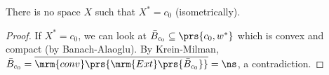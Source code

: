 \documentclass[10pt, twoside]{book}
\begin{document}
\begin{corollary}
There is no space $X$ such that $X^* = c_0$ (isometrically).
\end{corollary}

\begin{proof}
If $X^* = c_0$, we can look at $\bar{B}_{c_0} \subseteq \prs{c_0, w^*}$ which is convex and compact (by Banach-Alaoglu).
By Krein-Milman, $\bar{B}_{c_0} = \overline{\mrm{conv}\prs{\mrm{Ext}\prs{\bar{B}_{c_0}}}} = \ns$, a contradiction.
\end{proof}

\end{document}
